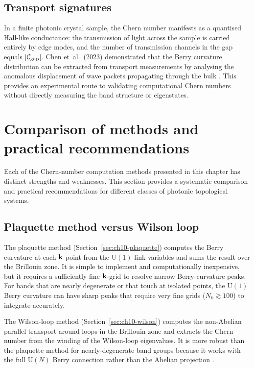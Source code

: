 \subsection{Transport signatures}
\label{sec:ch10-transport}

In a finite photonic crystal sample, the Chern number manifests as a
quantised Hall-like conductance: the transmission of light across the
sample is carried entirely by edge modes, and the number of
transmission channels in the gap equals $|\mathcal{C}_{\mathrm{gap}}|$.
Chen et~al.\ (2023) demonstrated that the Berry curvature distribution
can be extracted from transport measurements by analysing the
anomalous displacement of wave packets propagating through the bulk
\cite{chen2023berry}.  This provides an experimental route to
validating computational Chern numbers without directly measuring
the band structure or eigenstates.

\section{Comparison of methods and practical recommendations}
\label{sec:ch10-method-comparison}

Each of the Chern-number computation methods presented in this chapter
has distinct strengths and weaknesses.  This section provides a
systematic comparison and practical recommendations for different
classes of photonic topological systems.

\subsection{Plaquette method versus Wilson loop}
\label{sec:ch10-plaq-vs-wilson}

The plaquette method (Section~\ref{sec:ch10-plaquette}) computes the
Berry curvature at each $\mathbf{k}$ point from the $\mathrm{U}(1)$ link variables
and sums the result over the Brillouin zone.  It is simple to
implement and computationally inexpensive, but it requires a
sufficiently fine $\mathbf{k}$-grid to resolve narrow Berry-curvature
peaks.  For bands that are nearly degenerate or that touch at
isolated points, the $\mathrm{U}(1)$ Berry curvature can have sharp peaks
that require very fine grids ($N_k \gtrsim 100$) to integrate
accurately.

The Wilson-loop method (Section~\ref{sec:ch10-wilson}) computes the
non-Abelian parallel transport around loops in the Brillouin zone
and extracts the Chern number from the winding of the Wilson-loop
eigenvalues.  It is more robust than the plaquette method for
nearly-degenerate band groups because it works with the full
$\mathrm{U}(N)$ Berry connection rather than the Abelian projection
\cite{chen2023berry,asbth2016berry}.

